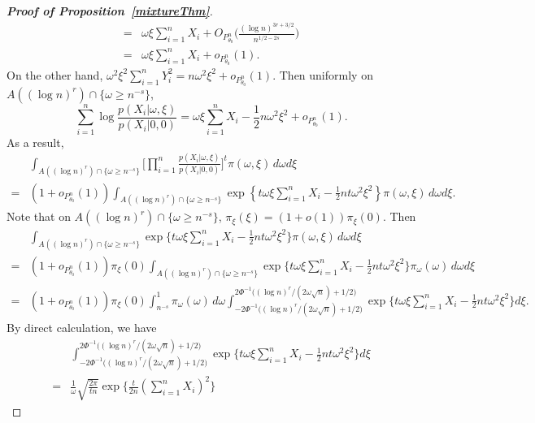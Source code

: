 \documentclass[11pt]{article}
\theoremstyle{plain}
\theoremstyle{definition}
\theoremstyle{remark}
\begin{document}
\begin{appendices}
\begin{proof}[\textbf{Proof of Proposition~\ref{mixtureThm}}]
\begin{align*}
    =&
    \omega \xi\sum_{i=1}^n X_i + O_{P^n_{\theta_0}}\Big( \frac{(\log n)^{3r+3/2}}{n^{1/2-2s}}\Big)
    \\
=&
\omega \xi\sum_{i=1}^n X_i + o_{P^n_{\theta_0}}(1).
\end{align*}
On the other hand, $\omega^2 \xi^2 \sum_{i=1}^n Y_i^2=n\omega^2 \xi^2 +o_{P^n_{\theta_0}}(1)$.
Then uniformly on $A((\log n)^r)\cap \{\omega\geq n^{-s}\}$,
\begin{equation}\label{eq:mixtureaiya1}
    \sum_{i=1}^n \log \frac{p(X_i|\omega,\xi)}{ p(X_i|0,0)}
    =\omega \xi \sum_{i=1}^n X_i -\frac{1}{2} n\omega^2 \xi^2+o_{P^n_{\theta_0}}(1).
\end{equation}
As a result,
\begin{align*}
    & \int_{A((\log n)^r)\cap \{\omega\geq n^{-s}\}} \Big[\prod_{i=1}^n \frac{p(X_i|\omega,\xi)}{p(X_i|0,0)}\Big]^t \pi(\omega,\xi)\, d\omega d\xi
    \\
    =&(1+o_{P^n_{\theta_0}}(1))\int_{A( (\log n)^r )\cap \{\omega\geq  n^{-s}\} } \exp\left\{
        t\omega \xi \sum_{i=1}^n X_i -\frac{1}{2} nt\omega^2 \xi^2
    \right\} \pi(\omega,\xi)\, d\omega d\xi.
\end{align*}
Note that on $A((\log n)^r)\cap \{\omega\geq n^{-s}\}$, $\pi_{\xi}(\xi)=(1+o(1))\pi_\xi(0)$. Then
\begin{align*}
    &\int_{A((\log n)^r)\cap \{\omega\geq n^{-s}\} } \exp\big\{
        t\omega \xi \sum_{i=1}^n X_i -\frac{1}{2} nt\omega^2 \xi^2
    \big\} \pi(\omega,\xi)\, d\omega d\xi
    \\
    =&(1+o_{P^n_{\theta_0}}(1))\pi_{\xi}(0)
    \int_{A((\log n)^r)\cap \{\omega\geq  n^{-s}\} } \exp\big\{
        t\omega \xi \sum_{i=1}^n X_i -\frac{1}{2} nt\omega^2 \xi^2
    \big\} \pi_{\omega}(\omega)\, d\omega d\xi
    \\
    =&(1+o_{P^n_{\theta_0}}(1))\pi_{\xi}(0)\int_{n^{-s}}^1 \pi_{\omega}(\omega)\, d\omega 
    \int_{-2\Phi^{-1}\big((\log n)^r/(2\omega \sqrt{n})+1/2\big)}^{2\Phi^{-1}\big((\log n)^r/(2\omega \sqrt{n})+1/2\big)} \exp\big\{
        t\omega \xi \sum_{i=1}^n X_i -\frac{1}{2} nt\omega^2 \xi^2
    \big\} d\xi.
\end{align*}
By direct calculation, we have
\begin{align*}
    &\int_{-2\Phi^{-1}\big((\log n)^r/(2\omega \sqrt{n})+1/2\big)}^{2\Phi^{-1}\big((\log n)^r/(2\omega \sqrt{n})+1/2\big)} \exp\big\{
        t\omega \xi \sum_{i=1}^n X_i -\frac{1}{2} nt\omega^2 \xi^2
\big\} d\xi
\\
=&
 \frac{1}{\omega} \sqrt{\frac{2\pi}{tn}}  \exp\Big\{\frac{t}{2n}(\sum_{i=1}^n X_i)^2\Big\}

\end{align*}
\end{proof}
\end{appendices}
\end{document}
